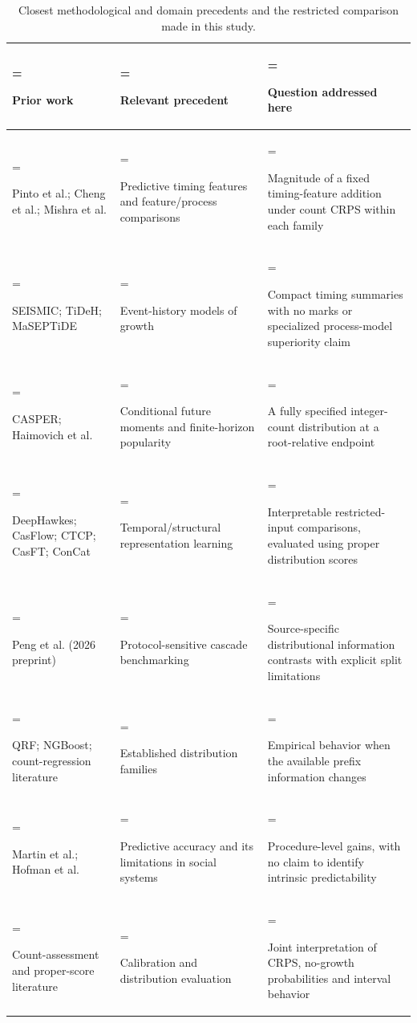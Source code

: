 
\begin{table}[t]
\caption{Closest methodological and domain precedents and the restricted comparison made in this study.}\label{tab:literature}
\centering\footnotesize\setlength{\tabcolsep}{3pt}\renewcommand{\arraystretch}{1.17}
\begin{tabularx}{\textwidth}{>{\hsize=0.78\hsize\linewidth=\hsize\raggedright\arraybackslash}X>{\hsize=1.0499999999999998\hsize\linewidth=\hsize\raggedright\arraybackslash}X>{\hsize=1.17\hsize\linewidth=\hsize\raggedright\arraybackslash}X}
\toprule
\textbf{Prior work} & \textbf{Relevant precedent} & \textbf{Question addressed here} \\ \midrule
Pinto et al.; Cheng et al.; Mishra et al. & Predictive timing features and feature/process comparisons & Magnitude of a fixed timing-feature addition under count CRPS within each family \\
SEISMIC; TiDeH; MaSEPTiDE & Event-history models of growth & Compact timing summaries with no marks or specialized process-model superiority claim \\
CASPER; Haimovich et al. & Conditional future moments and finite-horizon popularity & A fully specified integer-count distribution at a root-relative endpoint \\
DeepHawkes; CasFlow; CTCP; CasFT; ConCat & Temporal/structural representation learning & Interpretable restricted-input comparisons, evaluated using proper distribution scores \\
Peng et al. (2026 preprint) & Protocol-sensitive cascade benchmarking & Source-specific distributional information contrasts with explicit split limitations \\
QRF; NGBoost; count-regression literature & Established distribution families & Empirical behavior when the available prefix information changes \\
Martin et al.; Hofman et al. & Predictive accuracy and its limitations in social systems & Procedure-level gains, with no claim to identify intrinsic predictability \\
Count-assessment and proper-score literature & Calibration and distribution evaluation & Joint interpretation of CRPS, no-growth probabilities and interval behavior \\
\bottomrule\end{tabularx}
\end{table}
